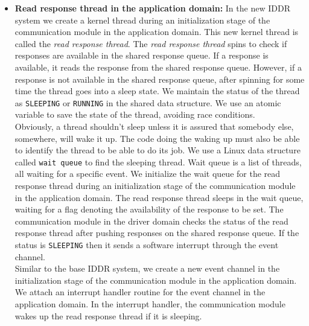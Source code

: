 \begin{itemize}
\item \textbf{Read response thread in the application domain:} 
In the new IDDR system we create a kernel thread during an initialization stage of the communication module in the application domain. This new kernel thread is called the \textit{read response thread}. The \textit{read response thread} spins to check if responses are available in the shared response queue. If a response is available, it reads the response from the shared response queue. However, if a response is not available in the shared response queue, after spinning for some time the thread goes into a sleep state. We maintain the status of the thread as \texttt{SLEEPING} or \texttt{RUNNING} in the shared data structure. We use an atomic variable to save the state of the thread, avoiding race conditions. 
\\[3mm]
Obviously, a thread shouldn't sleep unless it is assured that somebody else, somewhere, will wake it up. The code doing the waking up must also be able to identify the thread to be able to do its job. We use a Linux data structure called \texttt{wait queue} to find the sleeping thread. Wait queue is a list of threads, all waiting for a specific event\cite{Galvin, Bovet:2005:ULK:1077084}. We initialize the wait queue for the read response thread during an initialization stage of the communication module in the application domain. The read response thread sleeps in the wait queue, waiting for a flag denoting the availability of the response to be set. The communication module in the driver domain checks the status of the read response thread after pushing responses on the shared response queue. If the status is \texttt{SLEEPING} then it sends a software interrupt through the event channel.
\\[3mm]
Similar to the base IDDR system, we create a new event channel in the initialization stage of the communication module in the application domain. We attach an interrupt handler routine for the event channel in the application domain. In the interrupt handler, the communication module wakes up the read response thread if it is sleeping. 


\end{itemize}
